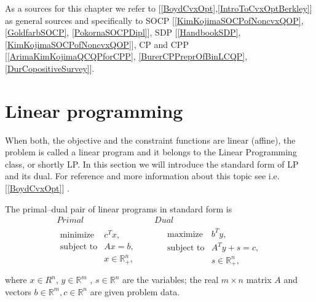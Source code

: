 \documentclass[12pt]{book}
\theoremstyle{definition}
\begin{document}
As a sources for this chapter we refer to [\ref{BoydCvxOpt},\ref{IntroToCvxOptBerkley}] as general sources and specifically to SOCP [\ref{KimKojimaSOCPofNoncvxQOP}, \ref{GoldfarbSOCP}, \ref{PokornaSOCPDipl}], SDP [\ref{HandbookSDP}, \ref{KimKojimaSOCPofNoncvxQOP}], CP and CPP [\ref{ArimaKimKojimaQCQPforCPP}, \ref{BurerCPPreprOfBinLCQP}, \ref{DurCopositiveSurvey}].












\section{Linear programming}

When both, the objective and the constraint functions are linear (affine), the problem is called a linear program and it belongs to the Linear Programming class, or shortly LP.
In this section we will introduce the standard form of LP and its dual. For reference and more information about this topic see i.e. [\ref{BoydCvxOpt}] .

\label{defLP}
The primal--dual pair of linear programs in standard form is 
\begin{equation}
\label{LP} 
\begin{array}{cc}
Primal & Dual \\
\begin{array}{ll}
\mbox{minimize} & c^Tx, \\
\mbox{subject to}& Ax = b ,  \\
& x \in \mathbb{R}^n_+,\\

\end{array} 
\ \ \ \ \ & \ \ \ \ \ 
\begin{array}{ll}
\mbox{maximize} & b^Ty, \\
\mbox{subject to}& A^Ty +s = c ,  \\
& s\in \mathbb{R}^n_+, \\
\end{array}
\end{array} 
\end{equation}
where $x\in R^n$, $y\in \mathbb{R}^m$ , $s\in \mathbb{R}^n$ are the variables; the real $m\times n$ matrix $A$ and vectors $b \in \mathbb{R}^m, c\in \mathbb{R}^n$ are given problem data.

\bigskip
\end{document}
